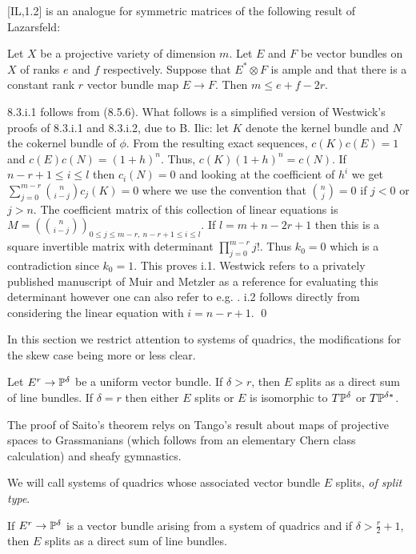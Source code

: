 [IL,1.2] is an analogue for symmetric matrices of the following result
of Lazarsfeld:

 Let $X$ be a projective variety of dimension $m$. Let
$E$ and $F$ be vector bundles on $X$ of ranks $e$ and $f$ respectively.
Suppose that $E^* \otimes F$ is ample and that there is a constant rank
$r$ vector bundle map $E \to F$. Then $m \le e + f - 2r$.
\endproclaim

8.3.i.1 follows from  (8.5.6).
What follows is a   simplified 
version of Westwick's   proofs of 8.3.i.1
and   8.3.i.2, due to B. Ilic:
let $K$ denote the kernel bundle   and
$N$ the cokernel bundle of $\phi$.
 From the resulting
 exact sequences, $c(K)c(E) = 1$ and $c(E)c(N) = (1+h)^n$.
Thus, $c(K)(1+h)^n = c(N)$. If $n-r+1 \le i \le l$ then $c_i(N) = 0$ and
looking at the coefficient of $h^i$ we get
$\sum_{j = 0}^{m-r} \binom{n}{i-j} c_j(K) = 0$ where we use the convention
that 
$\binom{n}{j} = 0$ if $j<0$ or $j > n$.  The coefficient matrix of this
collection of linear equations is 
$M = ( \binom{n}{i-j})_{0 \le j \le m-r, \  n-r+1 \le i \le l}$.
If $l = m + n -2r +1$ then this is a square invertible matrix with
determinant $\prod_{j=0}^{m-r} j!$. Thus $k_0 = 0$ which is a contradiction
since $k_0 = 1$. This proves i.1.
Westwick refers to a privately published manuscript of Muir and
 Metzler as a reference for evaluating
this determinant however one can also refer to e.g.  \cite{ACGH, pg.
93-95}.
i.2 follows directly from considering the linear equation with $i = n-r+1$.
\qed
\enddemo


 In this section we restrict
attention to systems of quadrics, the modifications for the
skew case being more or less clear.

 Let $E^r\rightarrow\Bbb P^{\delta}$
be a uniform vector bundle. If $\delta >r$, then $E$ splits as a direct sum
of line bundles. If $\delta =r$
then either $E$ splits or $E$ is isomorphic to $T\Bbb P^{\delta}$ or
$T\Bbb P^{\delta *}$.\endproclaim

The proof of Saito's theorem relys on Tango's result about maps
of projective spaces to Grassmanians (which follows from an elementary
Chern class calculation) and sheafy gymnastics.

We will call systems of quadrics 
whose associated vector bundle   $E$ splits, 
{\it of split type}.

If $E^r\rightarrow\Bbb P^{\delta}$ is a vector bundle
arising  from a system of quadrics
and if
$\delta >\frac r2 +1$, then $E$ splits as a direct sum of line bundles.
\endproclaim

